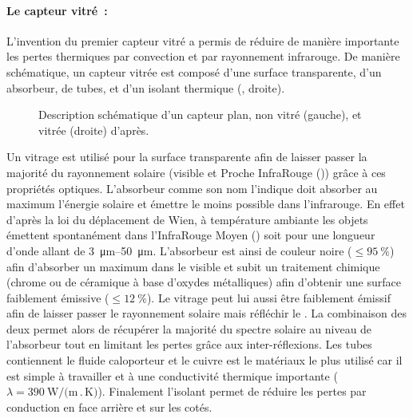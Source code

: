 \paragraph{Le capteur vitré~:} %
\label{par:le_capteur_vitre}
L’invention du premier capteur vitré  a permis de réduire de manière
importante les pertes thermiques par convection et par rayonnement infrarouge.
De manière schématique, un capteur vitrée est composé d’une surface transparente, d’un absorbeur,
de tubes, et d’un isolant thermique (, droite).

\begin{figure}
    \centering
    \caption{Description schématique d’un capteur plan, non vitré (gauche), et vitrée (droite)
             d’après.}
    \label{fig:schema_capteur_plan}
\end{figure}

Un vitrage est utilisé pour la surface transparente afin de laisser passer la
majorité du rayonnement solaire (visible et Proche InfraRouge ()) grâce à ces propriétés
optiques.
L’absorbeur comme son nom l’indique doit absorber au maximum l’énergie solaire et
émettre le moins possible dans l’infrarouge. En effet d’après la loi du déplacement
de Wien, à température ambiante les objets émettent spontanément dans l’InfraRouge
Moyen () soit pour une longueur d’onde allant de \SIrange{3}{50}{\micro\metre}.
L’absorbeur est ainsi de couleur noire ($\leq \SI{95}{\percent}$) afin d’absorber un maximum dans le visible
et subit un traitement chimique (chrome ou de céramique à base d’oxydes
métalliques) afin d’obtenir une surface faiblement émissive ($\leq \SI{12}{\percent}$).
Le vitrage peut lui aussi être faiblement émissif afin de laisser passer le rayonnement
solaire mais réfléchir le . La combinaison des deux permet alors de récupérer
la majorité du spectre solaire au niveau de l’absorbeur tout en limitant les
pertes grâce aux inter-réflexions. Les tubes contiennent le fluide caloporteur
et le cuivre est le matériaux le plus utilisé car il est simple à travailler et
à une conductivité thermique importante ($\lambda = \SI{390}{\watt\per(\metre\period\kelvin)}$).
Finalement l’isolant permet de réduire les pertes par conduction en face arrière et
sur les cotés.


